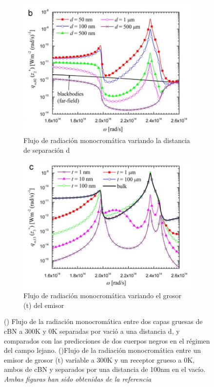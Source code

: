 \begin{figure}[H]
\centering
\begin{subfigure}[b]{0.48\textwidth}
	\centering
		\includegraphics[width=\textwidth]{figuras/graficaDiff_dc_fullEqu.png}
		\caption{Flujo de radiación monocromática variando la distancia de separación d}
	\label{fig:graficaDiff_dc_fullEqu}
\end{subfigure}
\begin{subfigure}[b]{0.48\textwidth}
	\centering
		\includegraphics[width=\textwidth]{figuras/graficaDiff_t_fullEqu.png}
		\caption{Flujo de radiación monocromática variando el grosor (t) del emisor}
	\label{fig:graficaDiff_t_fullEqu}
\end{subfigure}
\caption[Flujos de radiación monocromática por variación de grosor de emisor y variación de distancia]{() Flujo de la radiación monocromática entre dos capas gruesas de cBN a 300K y 0K separadas por vació a una distancia d, y comparados con las predicciones de dos cuerpos negros en el régimen del campo lejano. ()Flujo de la radiación monocromática entre un emisor de grosor (t) variable a 300K y un receptor grueso a 0K, ambos de cBN y separados por una distancia de 100nm en el vacío. \textit{Ambas figuras han sido obtenidas de la referencia \cite{nfTPV_fullEquations}}}%
\label{fig:graficas_fullEqu}%
\end{figure}
